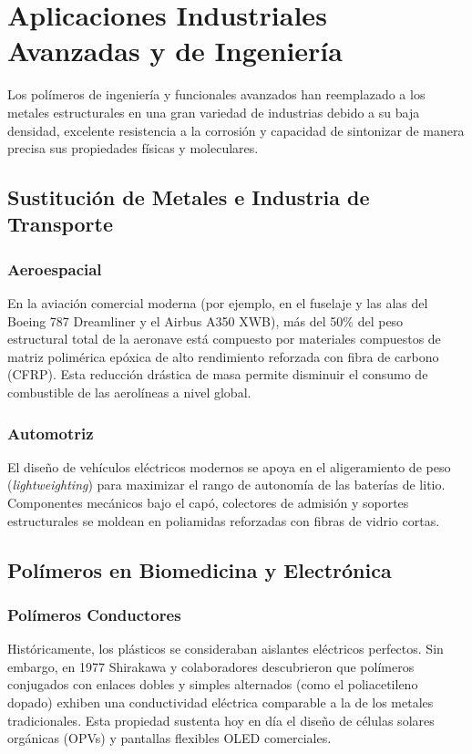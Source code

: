 \chapter{Aplicaciones Industriales Avanzadas y de Ingeniería}
\label{cap:aplicaciones}

Los polímeros de ingeniería y funcionales avanzados han reemplazado a los metales estructurales en una gran variedad de industrias debido a su baja densidad, excelente resistencia a la corrosión y capacidad de sintonizar de manera precisa sus propiedades físicas y moleculares.

\section{Sustitución de Metales e Industria de Transporte}

\subsection{Aeroespacial}
En la aviación comercial moderna (por ejemplo, en el fuselaje y las alas del Boeing 787 Dreamliner y el Airbus A350 XWB), más del 50\% del peso estructural total de la aeronave está compuesto por materiales compuestos de matriz polimérica epóxica de alto rendimiento reforzada con fibra de carbono (CFRP). Esta reducción drástica de masa permite disminuir el consumo de combustible de las aerolíneas a nivel global.

\subsection{Automotriz}
El diseño de vehículos eléctricos modernos se apoya en el aligeramiento de peso (\textit{lightweighting}) para maximizar el rango de autonomía de las baterías de litio. Componentes mecánicos bajo el capó, colectores de admisión y soportes estructurales se moldean en poliamidas reforzadas con fibras de vidrio cortas.

\section{Polímeros en Biomedicina y Electrónica}

\subsection{Polímeros Conductores}
Históricamente, los plásticos se consideraban aislantes eléctricos perfectos. Sin embargo, en 1977 Shirakawa y colaboradores \cite{shirakawa1977} descubrieron que polímeros conjugados con enlaces dobles y simples alternados (como el poliacetileno dopado) exhiben una conductividad eléctrica comparable a la de los metales tradicionales. Esta propiedad sustenta hoy en día el diseño de células solares orgánicas (OPVs) y pantallas flexibles OLED comerciales.

